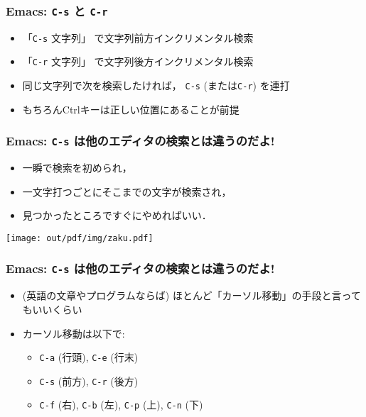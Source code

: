 \documentclass[12pt,dvipdfmx]{beamer}
\newcommand{\ao}[1]{{\color{blue}#1}}
\newcommand{\aka}[1]{{\color{red}#1}}
\begin{document}
\begin{frame}
\frametitle{Emacs: \texttt{\ao{C-s}} と \texttt{\ao{C-r}}}

\begin{itemize}
\item 「\texttt{\ao{C-s}} 文字列」 で文字列前方インクリメンタル検索
\item 「\texttt{\ao{C-r}} 文字列」 で文字列後方インクリメンタル検索

\item 同じ文字列で次を検索したければ，
\texttt{\ao{C-s}} (または\texttt{\ao{C-r}}) 
  を連打
\item<2-> {\footnotesize もちろんCtrlキーは正しい位置にあることが前提}
\end{itemize}
\end{frame}

\begin{frame}
\frametitle{Emacs: \texttt{\ao{C-s}}
  は他のエディタの検索とは違うのだよ!}
\begin{itemize}
\item \aka{一瞬で}検索を初められ，
\item 一文字打つごとにそこまでの文字が検索され，
\item 見つかったところですぐにやめればいい．
\end{itemize}

\begin{center}
\texttt{[image: out/pdf/img/zaku.pdf]}
\end{center}
\end{frame}

\begin{frame}
\frametitle{Emacs: \texttt{\ao{C-s}}
  は他のエディタの検索とは違うのだよ!}
\begin{itemize}
\item (英語の文章やプログラムならば)
  ほとんど「カーソル移動」の手段と言ってもいいくらい
\item \ao{カーソル移動は以下で:}
  \begin{itemize}
  \item \texttt{C-a} (行頭), \texttt{C-e} (行末)
  \item \aka{\texttt{C-s} (前方), \texttt{C-r} (後方)}
  \item \texttt{C-f} (右), \texttt{C-b} (左), \texttt{C-p} (上), \texttt{C-n} (下)
  \end{itemize}
\end{itemize}
\end{frame}
\end{document}
